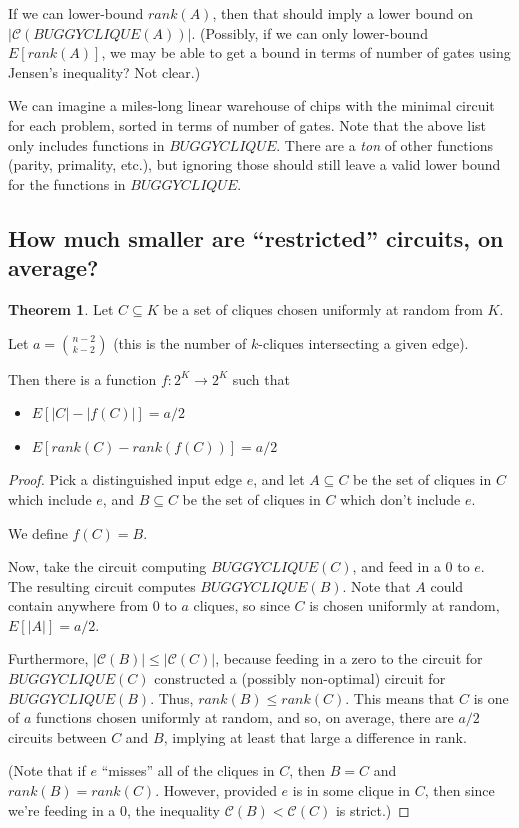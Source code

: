 \documentclass[12pt]{article}
\theoremstyle{definition}
\newtheorem{thm}{Theorem}[section]
\newcommand{\bigC}[0]{\mathcal{C}}
\begin{document}
If we can lower-bound $rank(A)$, then that should imply a
lower bound on $|\bigC(BUGGYCLIQUE(A))|$. (Possibly, if we
can only lower-bound $E[rank(A)]$, we may be able to get
a bound in terms of number of gates using Jensen's inequality?
Not clear.)

We can imagine a miles-long linear warehouse of chips with the minimal
circuit for each problem, sorted in terms of number of gates.
Note that the above list only includes functions in $BUGGYCLIQUE$.
There are a {\em ton} of other functions (parity, primality, etc.), but ignoring
those should still leave a valid lower bound for the functions in $BUGGYCLIQUE$.

\subsection{How much smaller are ``restricted'' circuits, on average?}

\begin{thm}
\label{vaguelyUpward}
Let $C \subseteq K$ be a set of cliques chosen uniformly at random
from $K$.

Let $a = {n-2 \choose k-2}$ (this is the number of $k$-cliques
intersecting a given edge).

Then there is a function $f: 2^K \rightarrow 2^K$ such that
\begin{itemize}

\item $E[|C| - |f(C)|] = a/2$

\item $E[rank(C) - rank(f(C))] = a/2$

\end{itemize}

\end{thm}
\begin{proof}

Pick a distinguished input edge $e$, and let $A \subseteq C$ be
the set of cliques in $C$ which include $e$, and $B \subseteq C$ be
the set of cliques in $C$ which don't include $e$.

We define $f(C) = B$.

Now, take the circuit computing $BUGGYCLIQUE(C)$, and
feed in a 0 to $e$. The resulting circuit computes
$BUGGYCLIQUE(B)$. Note that $A$ could contain anywhere
from 0 to $a$
cliques, so since $C$ is chosen uniformly at random,
$E[|A|] = a/2$.

Furthermore, $|\bigC(B)| \le |\bigC(C)|$, because feeding in
a zero to the circuit for $BUGGYCLIQUE(C)$ constructed a
(possibly non-optimal) circuit for $BUGGYCLIQUE(B)$.
Thus, $rank(B) \le rank(C)$.
This means that
$C$ is one of $a$ functions chosen uniformly at random,
and so, on average, there are $a/2$ circuits between $C$
and $B$, implying at least that large a difference in rank.

(Note that if $e$ ``misses'' all of the cliques in $C$, then $B = C$
and $rank(B) = rank(C)$. However, provided $e$ is in some clique in $C$,
then since we're feeding in a 0, the inequality $\bigC(B) < \bigC(C)$ is strict.)

\end{proof}
\end{document}
